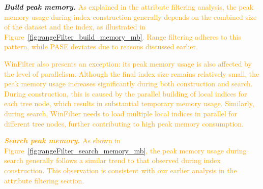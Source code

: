 \documentclass[sigconf, nonacm]{acmart}
\begin{document}
	
	\textit{\textbf{Build peak memory.}}  
	\textcolor{orange}{As explained in the attribute filtering analysis, the peak memory usage during index construction generally depends on the combined size of the dataset and the index, as illustrated in Figure~\ref{fig:rangeFilter_build_memory_mb}. Range filtering adheres to this pattern, while PASE deviates due to reasons discussed earlier.}  
	
	\textcolor{orange}{WinFilter also presents an exception:  its peak memory usage is also affected by the level of parallelism. Although the final index size remains relatively small, the peak memory usage increases significantly during both construction and search. During construction, this is caused by the parallel building of local indices for each tree node, which results in substantial temporary memory usage. Similarly, during search, WinFilter needs to load multiple local indices in parallel for different tree nodes, further contributing to high peak memory consumption.}
	

	
%	
%	


		\textit{\textbf{\textcolor{orange}{Search peak memory.}}}  
		\textcolor{orange}{As shown in Figure~\ref{fig:rangeFilter_search_memory_mb}, the peak memory usage during search generally follows a similar trend to that observed during index construction. This observation is consistent with our earlier analysis in the attribute filtering section.}
		
\end{document}
